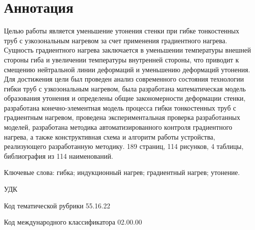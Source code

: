 
\section{Аннотация}

Целью работы является уменьшение утонения стенки при гибке тонкостенных труб с узкозональным нагревом за счет применения градиентного нагрева. Сущность градиентного нагрева заключается в уменьшении температуры внешней стороны гиба и увеличении температуры внутренней стороны, что приводит к смещению нейтральной линии деформаций и уменьшению деформаций утонения. Для достижения цели был проведен анализ современного состояния технологии гибки труб с узкозональным нагревом, была разработана математическая модель образования утонения и определены общие закономерности деформации стенки, разработана конечно-элементная модель процесса гибки тонкостенных труб с градиентным нагревом, проведена экспериментальная проверка разработанных моделей, разработана методика автоматизированного контроля градиентного нагрева, а также конструктивная схема и алгоритм работы устройства, реализующего разработанную методику.
189 страниц, 114 рисунков, 4 таблицы, библиография из 114 наименований.

Ключевые слова: гибка; индукционный нагрев; градиентный нагрев; утонение.

УДК \thesisUdk

Код тематической рубрики 55.16.22

Код международного классификатора 02.00.00


\clearpage